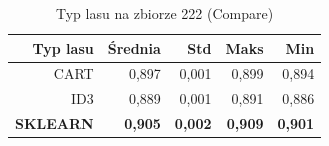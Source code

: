 \begin{table}[htbp]
\centering
\small
\setlength{\tabcolsep}{6pt}
\renewcommand{\arraystretch}{1.2}
\caption{Typ lasu na zbiorze 222 (Compare)}
\label{tab:Compare_on_222}
\begin{tabular}{r|r|r|r|r}
\toprule
Typ lasu & Średnia & Std & Maks & Min \\
\hline
CART & 0,897 & 0,001 & 0,899 & 0,894 \\
ID3 & 0,889 & 0,001 & 0,891 & 0,886 \\
\textbf{SKLEARN} & \textbf{0,905} & \textbf{0,002} & \textbf{0,909} & \textbf{0,901} \\
\bottomrule
\end{tabular}
\end{table}